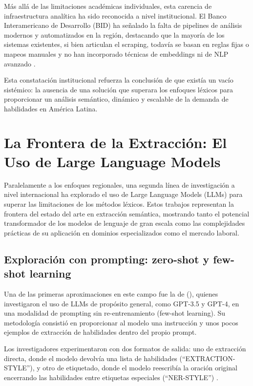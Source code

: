 Más allá de las limitaciones académicas individuales, esta carencia de infraestructura analítica ha sido reconocida a nivel institucional. El Banco Interamericano de Desarrollo (BID) ha señalado la falta de pipelines de análisis modernos y automatizados en la región, destacando que la mayoría de los sistemas existentes, si bien articulan el scraping, todavía se basan en reglas fijas o mapeos manuales y no han incorporado técnicas de embeddings ni de NLP avanzado \parencite{echeverria2022}.

Esta constatación institucional refuerza la conclusión de que existía un vacío sistémico: la ausencia de una solución que superara los enfoques léxicos para proporcionar un análisis semántico, dinámico y escalable de la demanda de habilidades en América Latina.

\section{La Frontera de la Extracción: El Uso de Large Language Models}

Paralelamente a los enfoques regionales, una segunda línea de investigación a nivel internacional ha explorado el uso de Large Language Models (LLMs) para superar las limitaciones de los métodos léxicos. Estos trabajos representan la frontera del estado del arte en extracción semántica, mostrando tanto el potencial transformador de los modelos de lenguaje de gran escala como las complejidades prácticas de su aplicación en dominios especializados como el mercado laboral.

\subsection{Exploración con prompting: zero-shot y few-shot learning}

Una de las primeras aproximaciones en este campo fue la de \citeauthor{nguyen2024} (\citeyear{nguyen2024}), quienes investigaron el uso de LLMs de propósito general, como GPT-3.5 y GPT-4, en una modalidad de prompting sin re-entrenamiento (few-shot learning). Su metodología consistió en proporcionar al modelo una instrucción y unos pocos ejemplos de extracción de habilidades dentro del propio prompt.

Los investigadores experimentaron con dos formatos de salida: uno de extracción directa, donde el modelo devolvía una lista de habilidades (``EXTRACTION-STYLE''), y otro de etiquetado, donde el modelo reescribía la oración original encerrando las habilidades entre etiquetas especiales (``NER-STYLE'') \parencite{nguyen2024}.

